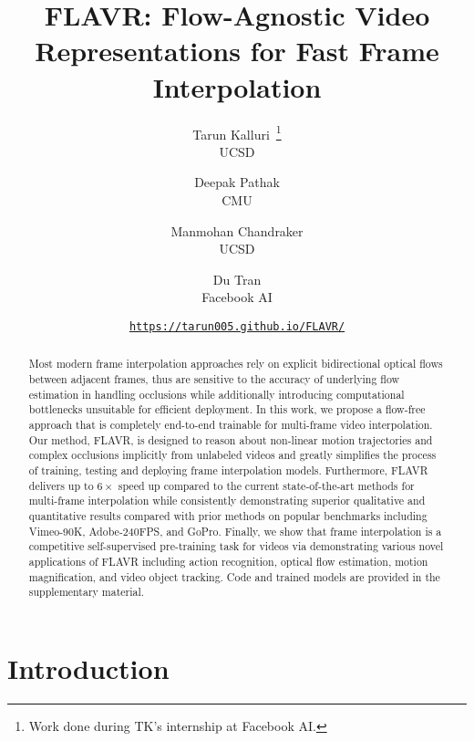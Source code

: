 \documentclass[10pt,twocolumn,letterpaper]{article}
\begin{document}
\title{FLAVR: Flow-Agnostic Video Representations for Fast Frame Interpolation}



\author{
Tarun Kalluri~\thanks{Work done during TK's internship at Facebook AI.}\\
UCSD
\and
Deepak Pathak\\
CMU
\and
Manmohan Chandraker\\
UCSD
\and
Du Tran\\
Facebook AI
\and
\texttt{\url{https://tarun005.github.io/FLAVR/}}
}


\maketitle

\begin{abstract}

Most modern frame interpolation approaches rely on explicit bidirectional optical flows between adjacent frames, thus are sensitive to the accuracy of underlying flow estimation in handling occlusions while additionally introducing computational bottlenecks unsuitable for efficient deployment. In this work, we propose a flow-free approach that is completely end-to-end trainable for multi-frame video interpolation. Our method, FLAVR, is designed to reason about non-linear motion trajectories and complex occlusions implicitly from unlabeled videos and greatly simplifies the process of training, testing and deploying frame interpolation models. Furthermore, FLAVR delivers up to $6\times$ speed up compared to the current state-of-the-art methods for multi-frame interpolation while consistently demonstrating superior qualitative and quantitative results compared with prior methods on popular benchmarks including Vimeo-90K, Adobe-240FPS, and GoPro. Finally, we show that frame interpolation is a competitive self-supervised pre-training task for videos via demonstrating various novel applications of FLAVR including action recognition, optical flow estimation, motion magnification, and video object tracking. Code and trained models are provided in the supplementary material.

\end{abstract}


\section{Introduction}
\end{document}
